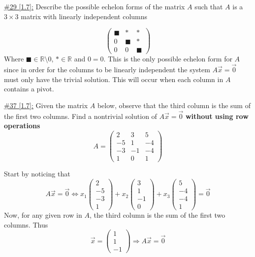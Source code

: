 \documentclass{exam}
\newcommand{\RR}{\mathbb R}
\begin{document}
\underline{\#29 [1.7]:} Describe the possible echelon forms of the matrix $A$ such that $A$ is a $3 \times 3$ matrix with linearly independent columns
\begin{solution}
    \[
        \boxed{
            \begin{pmatrix}
                \blacksquare & * & * \\
                0 & \blacksquare & * \\
                0 & 0 & \blacksquare
            \end{pmatrix}
        }
    \]
    Where $\blacksquare\in\RR \setminus {0}$, $* \in \RR$ and $0=0$. This is the only possible echelon form for $A$ since in order for the columns to be linearly independent the system $A\vec{x}=\vec{0}$ must only have the trivial solution. This will occur when each column in $A$ contains a pivot.
\end{solution}

\underline{\#37 [1.7]:} Given the matrix $A$ below, observe that the third column is the sum of the first two columns. Find a nontrivial solution of $A\vec{x}=\vec{0}$ \textbf{without using row operations}
\[
    A = \begin{pmatrix}
        2 & 3 & 5 \\
        -5 & 1 & -4 \\
        -3 & -1 & -4 \\
        1 & 0 & 1
    \end{pmatrix}
\]
\begin{solution}
    Start by noticing that
    \[
        A\vec{x} = \vec{0} \Leftrightarrow 
        x_1\begin{pmatrix}
            2 \\ -5 \\ -3 \\ 1
        \end{pmatrix}
        + 
        x_2\begin{pmatrix}
            3 \\ 1 \\ -1 \\ 0
        \end{pmatrix}
        + 
        x_3\begin{pmatrix}
            5 \\ -4 \\ -4 \\ 1
        \end{pmatrix}
        = \vec{0}
    \]
    Now, for any given row in $A$, the third column is the sum of the first two columns. Thus
    \[
        \boxed{\vec{x} = \begin{pmatrix} 1 \\ 1 \\ -1\end{pmatrix}} \Rightarrow A\vec{x} = \vec{0}
    \]
\end{solution}
\end{document}
